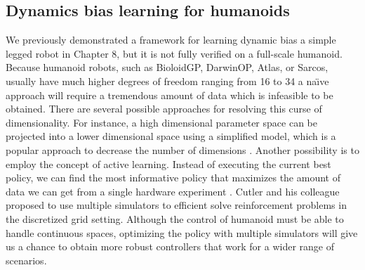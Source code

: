 \subsection{Dynamics bias learning for humanoids} 

We previously demonstrated a framework for learning dynamic bias
a simple legged robot in Chapter 8, but it is not fully verified on a
full-scale humanoid.
Because humanoid robots, such as BioloidGP, DarwinOP, Atlas, or Sarcos, usually
have much higher degrees of freedom ranging from 16 to 34
 a na\"{\i}ve approach will require
a tremendous amount of data which is infeasible to be obtained.
There are several possible approaches for resolving this curse of
dimensionality.
For instance, a high dimensional parameter space can be projected into a lower
dimensional space using a simplified model, which is a popular approach to
decrease the number of dimensions \cite{bib-humanoid13-trajectory}.
Another possibility is to employ the concept of active learning.
Instead of executing the current best policy, we can find the most
informative policy that maximizes the amount of data we can get from a
single hardware experiment \cite{DaSilva:2014:ACP}.
Cutler and his colleague \cite{bib-icra14-reinforcement} proposed to use
multiple simulators to efficient solve reinforcement problems in the
discretized grid setting.
Although the control of humanoid must be able to handle continuous spaces,
optimizing the policy with multiple simulators will give us a chance to obtain
more robust controllers that work for a wider range of scenarios.














